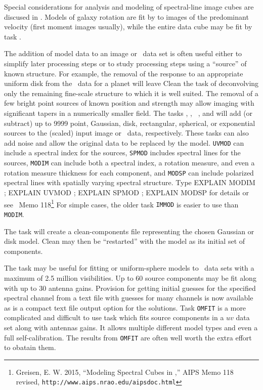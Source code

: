 
     Special considerations for analysis and modeling of spectral-line
image cubes are discused in .  Models of galaxy rotation
are fit by {\tt {}} to images of the predominant velocity
(first moment images usually), while the entire data cube may be fit
by task {\tt {}}\@.

     The addition of model data to an image or \uv\ data set is often
useful either to simplify later processing steps or to study
processing steps using a ``source'' of known structure.  For example,
the removal of the response to an appropriate uniform disk from the
\uv\ data for a planet will leave Clean the task of deconvolving only
the remaining fine-scale structure to which it is well suited.  The
removal of a few bright point sources of known position and strength
may allow imaging with significant tapers in a numerically smaller
field.  The tasks {\tt {}}, {\tt {}}, {\tt
{}}, and {\tt {}} will add (or subtract) up to
9999 point, Gaussian, disk, rectangular, spherical, or exponential
sources to the (scaled) input image or \uv\ data, respectively.  These
tasks can also add noise and allow the original data to be replaced by
the model.  {\tt UVMOD} can include a spectral index for the sources,
{\tt SPMOD} includes spectral lines for the sources, {\tt MODIM} can
include both a spectral index, a rotation measure, and even a rotation
measure thickness for each component, and {\tt MODSP} can include
polarized spectral lines with spatially varying spectral structure.
Type {\us EXPLAIN MODIM ; EXPLAIN UVMOD ; EXPLAIN SPMOD ; EXPLAIN
MODSP \CR} for details or see \AIPS\ Memo 118\footnote{Greisen, E. W.
2015, ``Modeling Spectral Cubes in \AIPS,'' AIPS Memo 118 revised,
{\tt http://www.aips.nrao.edu/aipsdoc.html}}  For simple cases, the
older task {\tt IMMOD} is easier to use than {\tt
MODIM}\@.

     The task {\tt {}} will create a clean-components file
representing the chosen Gaussian or disk model.  Clean may then be
``restarted'' with the model as its initial set of components.

The task {\tt {}} may be useful for fitting 
or uniform-sphere models to \uv\ data sets with a maximum of 2.5
million visibilities.  Up to 60 source components may be fit along
with up to 30 antenna gains.  Provision for getting initial guesses
for the specified spectral channel from a text file with guesses for
many channels is now available as is a compact text file output option
for the solutions.  Task {\tt OMFIT} is a more complicated and
difficult to use task which fits source components in a $uv$ data set
along with antennas gains.  It allows multiple different model types
and even a full self-calibration.  The results from {\tt OMFIT} are
often well worth the extra effort to obatain them.

